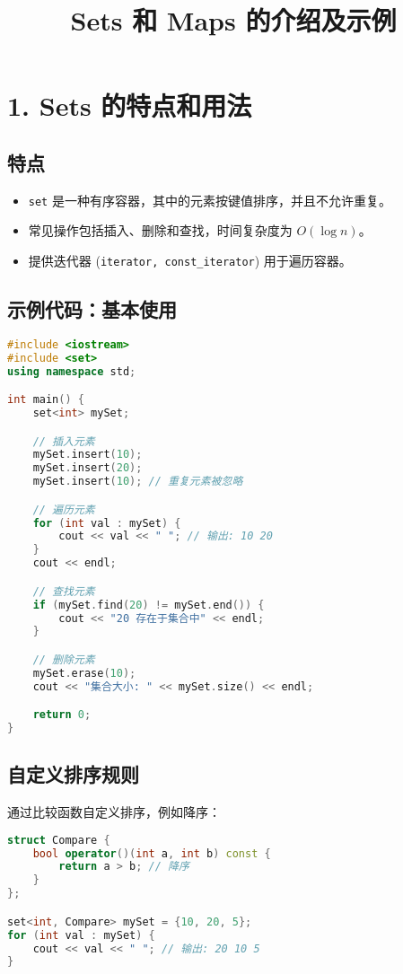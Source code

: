 \documentclass[a4paper,12pt]{article}
\title{Sets 和 Maps 的介绍及示例}
\author{}
\date{}
\begin{document}
\maketitle

\section*{1. Sets 的特点和用法}

\subsection*{特点}
\begin{itemize}
    \item \texttt{set} 是一种有序容器，其中的元素按键值排序，并且不允许重复。
    \item 常见操作包括插入、删除和查找，时间复杂度为 $O(\log n)$。
    \item 提供迭代器 (\texttt{iterator, const\_iterator}) 用于遍历容器。
\end{itemize}

\subsection*{示例代码：基本使用}
\begin{lstlisting}[language=C++, caption=Set 示例]
#include <iostream>
#include <set>
using namespace std;

int main() {
    set<int> mySet;

    // 插入元素
    mySet.insert(10);
    mySet.insert(20);
    mySet.insert(10); // 重复元素被忽略

    // 遍历元素
    for (int val : mySet) {
        cout << val << " "; // 输出: 10 20
    }
    cout << endl;

    // 查找元素
    if (mySet.find(20) != mySet.end()) {
        cout << "20 存在于集合中" << endl;
    }

    // 删除元素
    mySet.erase(10);
    cout << "集合大小: " << mySet.size() << endl;

    return 0;
}
\end{lstlisting}

\subsection*{自定义排序规则}
通过比较函数自定义排序，例如降序：
\begin{lstlisting}[language=C++, caption=Set 自定义排序]
struct Compare {
    bool operator()(int a, int b) const {
        return a > b; // 降序
    }
};

set<int, Compare> mySet = {10, 20, 5};
for (int val : mySet) {
    cout << val << " "; // 输出: 20 10 5
}
\end{lstlisting}
\end{document}
